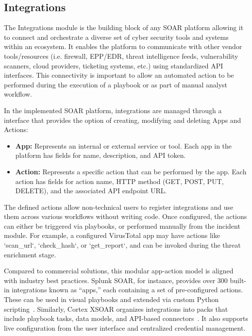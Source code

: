 \subsection{Integrations}

The Integrations module is the building block of any SOAR platform allowing it to connect and orchestrate a diverse set of cyber security tools and systems within an ecosystem. It enables the platform to communicate with other vendor tools/resources (i.e. firewall, EPP/EDR, threat intelligence feeds, vulnerability scanners, cloud providers, ticketing systems, etc.) using standardized API interfaces. This connectivity is important to allow an automated action to be performed during the execution of a playbook or as part of manual analyst workflow. 

In the implemented SOAR platform, integrations are managed through a interface that provides the option of creating, modifying and deleting Apps and Actions:

\begin{itemize}[noitemsep,topsep=0pt]
    \item \textbf{App:} Represents an internal or external service or tool. Each app in the platform has fields for name, description, and API token.
    \item \textbf{Action:} Represents a specific action that can be performed by the app. Each action has fields for action name, HTTP method (GET, POST, PUT, DELETE), and the associated API endpoint URL.
\end{itemize}

The defined actions allow non-technical users to register integrations and use them across various workflows without writing code. Once configured, the actions can either be triggered via playbooks, or performed manually from the incident module. For example, a configured VirusTotal app may have actions like ‘scan\_url‘, ‘check\_hash‘, or ‘get\_report‘, and can be invoked during the threat enrichment stage.

Compared to commercial solutions, this modular app-action model is aligned with industry best practices. Splunk SOAR, for instance, provides over 300 built-in integrations known as “apps,” each containing a set of pre-configured actions. These can be used in visual playbooks and extended via custom Python scripting~\cite{splunk}. Similarly, Cortex XSOAR organizes integrations into packs that include playbook tasks, data models, and API-based connectors~\cite{paloalto}. It also supports live configuration from the user interface and centralized credential management.

